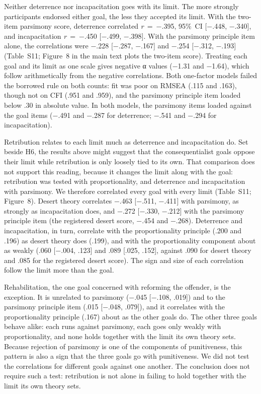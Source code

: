 Neither deterrence nor incapacitation goes with its limit. The more strongly participants endorsed either goal, the less they accepted its limit. With the two-item parsimony score, deterrence correlated \emph{r}~=~−.395, 95\%~CI {[}−.448, −.340{]}, and incapacitation \emph{r}~=~−.450 {[}−.499, −.398{]}. With the parsimony principle item alone, the correlations were −.228 {[}−.287, −.167{]} and −.254 {[}−.312, −.193{]} (Table~S11; Figure~8 in the main text plots the two-item score). Treating each goal and its limit as one scale gives negative α values (−1.31 and −1.64), which follow arithmetically from the negative correlations. Both one-factor models failed the borrowed rule on both counts: fit was poor on RMSEA (.115 and .163), though not on CFI (.951 and .959), and the parsimony principle item loaded below .30 in absolute value. In both models, the parsimony items loaded against the goal items (−.491 and −.287 for deterrence; −.541 and −.294 for incapacitation).

Retribution relates to each limit much as deterrence and incapacitation do. Set beside H6, the results above might suggest that the consequentialist goals oppose their limit while retribution is only loosely tied to its own. That comparison does not support this reading, because it changes the limit along with the goal: retribution was tested with proportionality, and deterrence and incapacitation with parsimony. We therefore correlated every goal with every limit (Table~S11; Figure~8). Desert theory correlates −.463 {[}−.511, −.411{]} with parsimony, as strongly as incapacitation does, and −.272 {[}−.330, −.212{]} with the parsimony principle item (the registered desert score, −.454 and −.268). Deterrence and incapacitation, in turn, correlate with the proportionality principle (.200 and .196) as desert theory does (.199), and with the proportionality component about as weakly (.060 {[}−.004, .123{]} and .089 {[}.025, .152{]}, against .090 for desert theory and .085 for the registered desert score). The sign and size of each correlation follow the limit more than the goal.

Rehabilitation, the one goal concerned with reforming the offender, is the exception. It is unrelated to parsimony (−.045 {[}−.108, .019{]}) and to the parsimony principle item (.015 {[}−.048, .079{]}), and it correlates with the proportionality principle (.167) about as the other goals do. The other three goals behave alike: each runs against parsimony, each goes only weakly with proportionality, and none holds together with the limit its own theory sets. Because rejection of parsimony is one of the components of punitiveness, this pattern is also a sign that the three goals go with punitiveness. We did not test the correlations for different goals against one another. The conclusion does not require such a test: retribution is not alone in failing to hold together with the limit its own theory sets.

